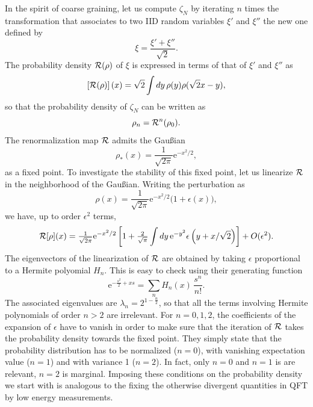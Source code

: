 \documentclass[12pt,here,feynmf]{article}
\begin{document}
In the spirit of coarse graining, let us compute $\zeta_{N}$ by iterating $n$ times the transformation that associates to two IID random variables $\xi'$ and $\xi''$ the new one defined by  
\begin{equation}
\xi=\frac{\xi'+\xi''}{\sqrt{2}}.
\end{equation}
The probability density ${\cal R}(\rho)$ of $\xi$ is expressed in terms of that of $\xi'$ and $\xi''$ as
\begin{equation}
\left[{\cal R}(\rho)\right](x)=\sqrt{2}\int dy\, \rho(y)\rho(\sqrt{2}x-y),
\end{equation}
so that the probability density of $\zeta_{N}$ can be written as
\begin{equation} 
\rho_{n}={\cal R}^{n}(\rho_{0}).
\end{equation}
The renormalization map ${\cal R}$ admits the Gau\ss ian
\begin{equation}
\rho_{*}(x)=\textstyle{\frac{1}{\sqrt{2\pi}}}\mathrm{e}^{-x^{2}/2},
\end{equation}
as a fixed point. To investigate the stability of this fixed point, let us linearize ${\cal R}$ in the neighborhood of the Gau\ss ian. Writing the perturbation as
\begin{equation}
\rho(x)=\textstyle{\frac{1}{\sqrt{2\pi}}}\mathrm{e}^{-x^{2}/2}
\Big(1+\epsilon(x)\Big),
\end{equation}
we have, up to order $\epsilon^{2}$ terms, 
\begin{equation}
{\cal R}[\rho](x)={\textstyle\frac{1}{\sqrt{2\pi}}}\mathrm{e}^{-x^{2}/2}\left[1+{\textstyle\frac{2}{\sqrt{\pi}}}
\int dy \,\mathrm{e}^{-y^{2}}\epsilon\left(y+x/\sqrt{2}\right)
\right]
+O(\epsilon^{2}).
\end{equation}
The eigenvectors of the linearization  of ${\cal R}$ are obtained by taking $\epsilon$ proportional to a Hermite polyomial $H_{n}$. This is easy to check using their generating function
\begin{equation}
\mathrm{e}^{-\frac{s^{2}}{2}+xs}=\sum_{n}H_{n}(x)\,\frac{s^{n}}{n!}.
\end{equation}
The associated eigenvalues are $\lambda_{n}=2^{1-\frac{n}{2}}$, so that all the terms involving Hermite polynomials of order $n>2$ are irrelevant. For $n=0,1,2$, the coefficients of the expansion of $\epsilon$  have to vanish in order to make sure that the iteration of ${\cal R}$ takes the probability density towards the fixed point. They simply state that the probability distribution has to be normalized ($n=0$), with vanishing expectation value ($n=1$) and with variance  1 ($n=2$). In fact, only $n=0$ and $n=1$ is are relevant, $n=2$ is marginal. Imposing these conditions on the probability density we start with is analogous to the fixing the otherwise divergent quantities in QFT by low energy measurements. 
\end{document}
